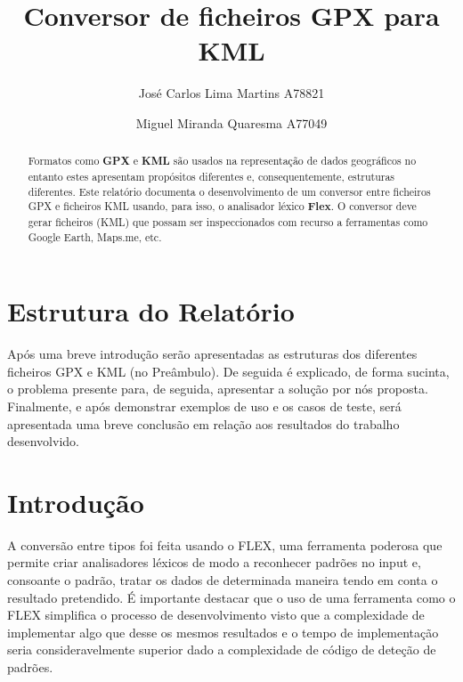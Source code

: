 \documentclass{llncs}
\begin{document}
 \mainmatter
\title{Conversor de ficheiros GPX para KML}
\author{José Carlos Lima Martins A78821 \and
        Miguel Miranda Quaresma A77049}

\maketitle

\justify

\begin{abstract}
    Formatos como \textbf{GPX} e \textbf{KML} são usados na representação de dados geográficos no entanto estes apresentam propósitos diferentes e, consequentemente, estruturas diferentes. Este relatório documenta o desenvolvimento de um conversor entre ficheiros GPX e ficheiros KML usando, para isso, o analisador léxico \textbf{Flex}. O conversor deve gerar ficheiros (KML) que possam ser inspeccionados com recurso a ferramentas como Google Earth, Maps.me, etc.
\end{abstract}

\section{Estrutura do Relatório}
Após uma breve introdução serão apresentadas as estruturas dos diferentes ficheiros GPX e KML (no Preâmbulo). De seguida é explicado, de forma sucinta, o problema presente para, de seguida, apresentar a solução por nós proposta. Finalmente, e após demonstrar exemplos de uso e os casos de teste, será apresentada uma breve conclusão em relação aos resultados do trabalho desenvolvido.

\section{Introdução}
A conversão entre tipos foi feita usando o FLEX, uma ferramenta poderosa que permite criar analisadores léxicos de modo a reconhecer padrões no input e, consoante o padrão, tratar os dados de determinada maneira tendo em conta o resultado pretendido. É importante destacar que o uso  de uma ferramenta como o FLEX simplifica o processo de desenvolvimento visto que a complexidade de implementar algo que desse os mesmos resultados e o tempo de implementação seria consideravelmente superior dado a complexidade de código de deteção de padrões.
\end{document}
